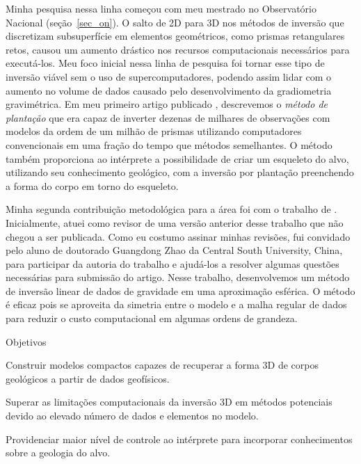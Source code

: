 \documentclass[10pt,a4paper,oneside]{book}
\begin{document}
Minha pesquisa nessa linha começou com meu mestrado no Observatório Nacional
(seção~\ref{sec_on}).
O salto de 2D para 3D nos métodos de inversão que discretizam subsuperfície em
elementos geométricos, como prismas retangulares retos, causou um aumento
drástico nos recursos computacionais necessários para executá-los.
Meu foco inicial nessa linha de pesquisa foi tornar esse tipo de inversão
viável sem o uso de supercomputadores, podendo assim lidar com o aumento no
volume de dados causado pelo desenvolvimento da gradiometria gravimétrica.
Em meu primeiro artigo publicado \citep{Uieda2012}, descrevemos o
\textit{método de plantação} que era capaz de inverter dezenas de milhares de
observações com modelos da ordem de um milhão de prismas utilizando
computadores convencionais em uma fração do tempo que métodos semelhantes.
O método também proporciona ao intérprete a possibilidade de criar um esqueleto
do alvo, utilizando seu conhecimento geológico, com a inversão por plantação
preenchendo a forma do corpo em torno do esqueleto.

Minha segunda contribuição metodológica para a área foi com o trabalho de
\citet{Zhao2019}.
Inicialmente, atuei como revisor de uma versão anterior desse trabalho que não
chegou a ser publicada.
Como eu costumo assinar minhas revisões, fui convidado pelo aluno de doutorado
Guangdong Zhao da Central South University, China, para participar da autoria
do trabalho e ajudá-los a resolver algumas questões necessárias para submissão
do artigo.
Nesse trabalho, desenvolvemos um método de inversão linear de dados de
gravidade em uma aproximação esférica.
O método é eficaz pois se aproveita da simetria entre o modelo e a malha regular
de dados para reduzir o custo computacional em algumas ordens de grandeza.

\begin{fancyenum}{\faBullseye}{Objetivos}
   \item Construir modelos compactos capazes de recuperar a forma 3D de corpos
     geológicos a partir de dados geofísicos.
   \item Superar as limitações computacionais da inversão 3D em métodos
     potenciais devido ao elevado número de dados e elementos no modelo.
   \item Providenciar maior nível de controle ao intérprete para incorporar
     conhecimentos sobre a geologia do alvo.
\end{fancyenum}
\end{document}
